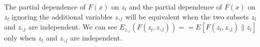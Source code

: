 \documentclass[11pt]{article}
\begin{document}
\vspace{5 mm}
\noindent
 The partial dependence of $F(x)$ on $z_{l}$ and the partial dependence of $F(x)$ on 
 $z_{l}$ ignoring the additional variables $z_{\backslash l}$ will be equivalent
  when the two subsets $z_{l}$ and $z_{\backslash l}$ are independent.  We can see
   $E_{z_{\backslash l}}(F(z_{l}, z_{\backslash l})) == E[F(z_{l}, 
   z_{\backslash l})\|z_{l}]$ only when $z_{l}$ and $z_{\backslash l}$ are independent.
\end{document}
